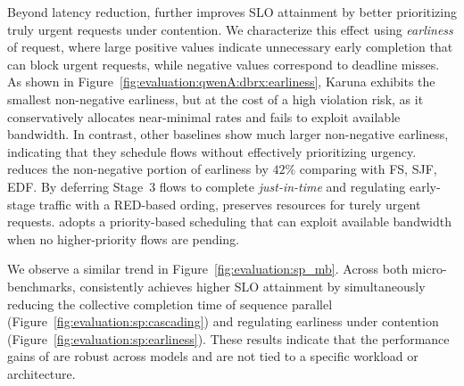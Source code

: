 Beyond latency reduction, \sys{} further improves SLO attainment by better prioritizing truly urgent requests under contention.
We characterize this effect using \emph{earliness} of request, where large positive values indicate unnecessary early completion that can block urgent requests, while negative values correspond to deadline misses.
As shown in Figure~\ref{fig:evaluation:qwenA:dbrx:earliness}, Karuna exhibits the smallest non-negative earliness, but at the cost of a high violation risk, as it conservatively allocates near-minimal rates and fails to exploit available bandwidth.
In contrast, other baselines show much larger non-negative earliness, indicating that they schedule flows without effectively prioritizing urgency.
\sys{} reduces the non-negative portion of earliness by $42\%$ comparing with FS, SJF, EDF. By deferring Stage~3 flows to complete \textit{just-in-time} and regulating early-stage traffic with a RED-based ording, \sys{} preserves resources for turely urgent requests. \sys{} adopts a priority-based scheduling that can exploit available bandwidth when no higher-priority flows are pending.

We observe a similar trend in Figure~\ref{fig:evaluation:sp_mb}.
Across both micro-benchmarks, \sys{} consistently achieves higher SLO attainment by simultaneously reducing the collective completion time of sequence parallel (Figure~\ref{fig:evaluation:sp:cascading}) and regulating earliness under contention (Figure~\ref{fig:evaluation:sp:earliness}).
These results indicate that the performance gains of \sys{} are robust across models and are not tied to a specific workload or architecture.

